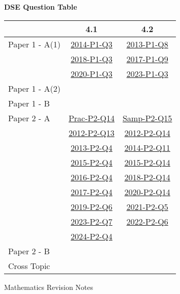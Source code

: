 \documentclass[12pt, a4paper]{article}
\begin{document}
\begin{absolutelynopagebreak}
\begin{center}
\textbf{DSE Question Table}
\end{center}
\begin{center}
\begin{tabular}{|l|c|c|}
\hline
        & 4.1 & 4.2 \\\hline
\hline
Paper 1 - A(1)& \hyperref[DSE2014-CoreP1-Q03]{2014-P1-Q3} & \hyperref[DSE2013-CoreP1-Q08]{2013-P1-Q8} \\
& \hyperref[DSE2018-CoreP1-Q03]{2018-P1-Q3} & \hyperref[DSE2017-CoreP1-Q09]{2017-P1-Q9} \\
& \hyperref[DSE2020-CoreP1-Q03]{2020-P1-Q3} & \hyperref[DSE2023-CoreP1-Q03]{2023-P1-Q3} \\
\hline
Paper 1 - A(2)&  &  \\
\hline
Paper 1 - B&  &  \\
\hline
\hline
Paper 2 - A& \hyperref[DSE2012P-CoreP2-Q14]{Prac-P2-Q14} & \hyperref[DSE2012S-CoreP2-Q15]{Samp-P2-Q15} \\
& \hyperref[DSE2012-CoreP2-Q13]{2012-P2-Q13} & \hyperref[DSE2012-CoreP2-Q14]{2012-P2-Q14} \\
& \hyperref[DSE2013-CoreP2-Q04]{2013-P2-Q4} & \hyperref[DSE2014-CoreP2-Q11]{2014-P2-Q11} \\
& \hyperref[DSE2015-CoreP2-Q04]{2015-P2-Q4} & \hyperref[DSE2015-CoreP2-Q14]{2015-P2-Q14} \\
& \hyperref[DSE2016-CoreP2-Q04]{2016-P2-Q4} & \hyperref[DSE2018-CoreP2-Q14]{2018-P2-Q14} \\
& \hyperref[DSE2017-CoreP2-Q04]{2017-P2-Q4} & \hyperref[DSE2020-CoreP2-Q14]{2020-P2-Q14} \\
& \hyperref[DSE2019-CoreP2-Q06]{2019-P2-Q6} & \hyperref[DSE2021-CoreP2-Q05]{2021-P2-Q5} \\
& \hyperref[DSE2023-CoreP2-Q07]{2023-P2-Q7} & \hyperref[DSE2022-CoreP2-Q06]{2022-P2-Q6} \\
& \hyperref[DSE2024-CoreP2-Q04]{2024-P2-Q4} &  \\
\hline
Paper 2 - B&  &  \\
\hline
\hline
Cross Topic&  &  \\
\hline
\end{tabular}
\end{center}
\end{absolutelynopagebreak}
\newpage
\newpage
\thispagestyle{empty}
\begin{center}
Mathematics Revision Notes\\\vspace{1cm}
\\\vspace{1cm}
{\fontsize{24pt}{24pt}\selectfont {Angles related to Rectilinear Figures}} \\\vspace{1cm}
\label{chapter:S2-5}

\end{center}
\vspace{0.5cm}
\hline
\end{document}
